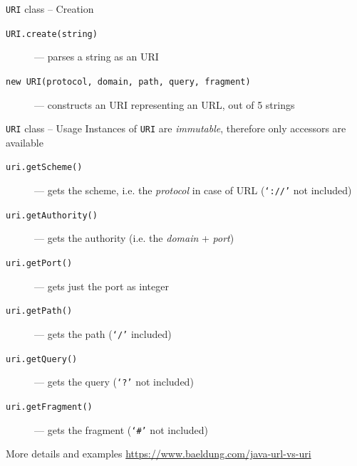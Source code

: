 \documentclass[presentation]{beamer}\mode<presentation>{\usetheme{AMSBolognaFC}}
\begin{document}
\begin{frame}[allowframebreaks]
    \begin{block}{\texttt{URI} class -- Creation}
        \begin{description}
            \item[\texttt{URI.create(string)}] --- parses a string as an URI
            \item[\texttt{new URI(protocol, domain, path, query, fragment)}] --- constructs an URI representing an URL, out of 5 strings
        \end{description}
    \end{block}

    \begin{block}{\texttt{URI} class -- Usage}
        Instances of \texttt{URI} are \emph{immutable}, therefore only accessors are available
        \begin{description}
            \item[\texttt{uri.getScheme()}] --- gets the scheme, i.e. the \emph{protocol} in case of URL (\texttt{`://'} not included)
            \item[\texttt{uri.getAuthority()}] --- gets the authority (i.e. the \emph{domain} + \emph{port})
            \item[\texttt{uri.getPort()}] --- gets just the port as integer
            \item[\texttt{uri.getPath()}] --- gets the path (\texttt{`/'} included)
            \item[\texttt{uri.getQuery()}] --- gets the query (\texttt{`?'} not included)
            \item[\texttt{uri.getFragment()}] --- gets the fragment (\texttt{`\#'} not included)
        \end{description}
    \end{block}

    \begin{exampleblock}{More details and examples}\centering
        \url{https://www.baeldung.com/java-url-vs-uri}
    \end{exampleblock}

\end{frame}
\end{document}
